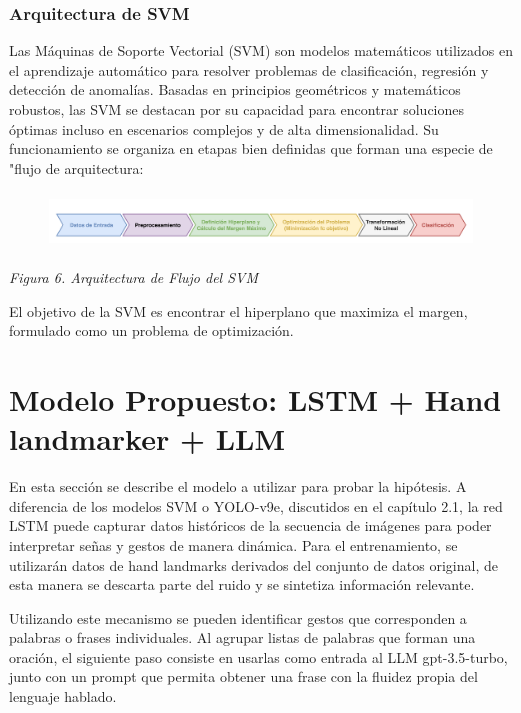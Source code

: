 \documentclass[10pt]{article}
\begin{document}
\vspace{3\baselineskip}
\subsubsection{Arquitectura de SVM}

Las Máquinas de Soporte Vectorial (SVM) son modelos matemáticos utilizados en el aprendizaje automático para resolver problemas de clasificación, regresión y detección de anomalías. Basadas en principios geométricos y matemáticos robustos, las SVM se destacan por su capacidad para encontrar soluciones óptimas incluso en escenarios complejos y de alta dimensionalidad.  Su funcionamiento se organiza en etapas bien definidas que forman una especie de "flujo de arquitectura:

\begin{figure}[H]
\includegraphics[width=14.33cm,height=1.51cm]{./images/image3.png}
\end{figure}


\begin{center}
\textit{Figura 6. Arquitectura de Flujo del SVM}
\end{center}


El objetivo de la SVM es encontrar el hiperplano que maximiza el margen, formulado como un problema de optimización.

\vspace{1\baselineskip}
\section{Modelo Propuesto: LSTM + Hand landmarker + LLM}

\vspace{1\baselineskip}
En esta sección se describe el modelo a utilizar para probar la hipótesis. A diferencia de los modelos SVM o YOLO-v9e, discutidos en el capítulo 2.1, la red LSTM puede capturar datos históricos de la secuencia de imágenes para poder interpretar señas y gestos de manera dinámica. Para el entrenamiento, se utilizarán datos de hand landmarks derivados del conjunto de datos original, de esta manera se descarta parte del ruido y se sintetiza información relevante.

\vspace{1\baselineskip}
Utilizando este mecanismo se pueden identificar gestos que corresponden a palabras o frases individuales. Al agrupar listas de palabras que forman una oración, el siguiente paso consiste en usarlas como entrada al LLM gpt-3.5-turbo, junto con un prompt que permita obtener una frase con la fluidez propia del lenguaje hablado.
\end{document}
